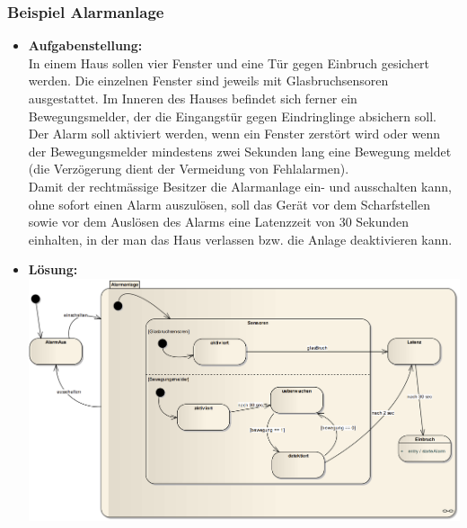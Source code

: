 \subsubsection{Beispiel Alarmanlage}
\begin{itemize}
  \item \textbf{Aufgabenstellung:}\\In einem Haus sollen vier Fenster und eine Tür gegen Einbruch gesichert werden. Die einzelnen Fenster
        sind jeweils mit Glasbruchsensoren ausgestattet. Im Inneren des Hauses befindet sich ferner ein Bewegungsmelder, der die Eingangstür gegen Eindringlinge absichern soll. Der Alarm soll aktiviert werden, wenn
        ein Fenster zerstört wird oder wenn der Bewegungsmelder mindestens zwei Sekunden lang eine Bewegung
        meldet (die Verzögerung dient der Vermeidung von Fehlalarmen).\\
        Damit der rechtmässige Besitzer die Alarmanlage ein- und ausschalten kann, ohne sofort einen Alarm auszulösen, soll das Gerät vor dem Scharfstellen sowie vor dem Auslösen des Alarms eine Latenzzeit von 30
        Sekunden einhalten, in der man das Haus verlassen bzw. die Anlage deaktivieren kann.
  \item \textbf{Lösung:}\\ \includegraphics[width=\linewidth]{images/FSM/Bsp_Alarmanlage.png}
\end{itemize}
\newpage
